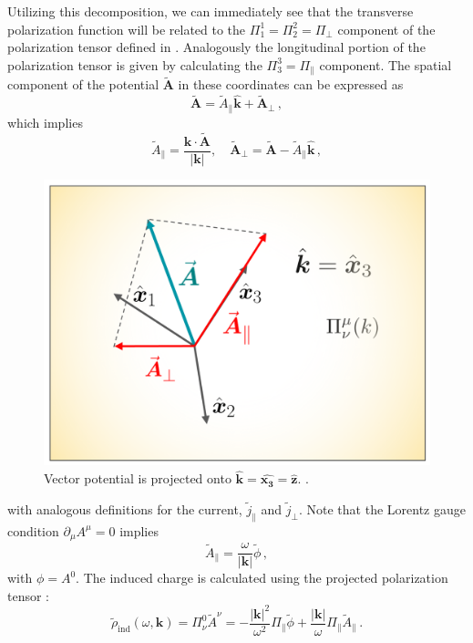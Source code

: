 Utilizing this decomposition, we can immediately see that the transverse polarization function will be related to the $\Pi^1_1 = \Pi^2_2 = \Pi_\perp$ component of the polarization tensor defined in . Analogously the longitudinal portion of the polarization tensor is given by calculating the $\Pi^3_3 = \Pi_\parallel$ component. The spatial component of the potential $\widetilde{\boldsymbol{A}}$  in these coordinates can be expressed as
\begin{equation}
\widetilde{\boldsymbol{A}} = \widetilde{A}_\parallel \hat{\boldsymbol{k}} + \widetilde{\boldsymbol{A}}_\perp\,,
\end{equation}
which implies
\begin{equation}
 \widetilde{A}_{\parallel} = \frac{\boldsymbol{k} \cdot  \widetilde{\boldsymbol{A}}}{|\boldsymbol{k}|}, \quad   \widetilde{\boldsymbol{A}}_{\perp} = \widetilde{\boldsymbol{A}} -  \widetilde{A}_{\parallel}\hat{\boldsymbol{k}}\,,
\end{equation}
\begin{figure}[ht]
    \centering
    \includegraphics[width=0.55\linewidth]{plots/chap01intro/Screenshot 2024-03-14 124133.png}
    \caption{Vector potential is projected onto $\boldsymbol{\hat{k}} = \boldsymbol{\hat{x_3}} =\boldsymbol{\hat{z}}$. .}
    \label{fig:project}
\end{figure}
with analogous definitions for the current, $\widetilde{j}_{\parallel}$ and $\widetilde{j}_{\perp}$. Note that the Lorentz gauge condition $\partial_\mu A^\mu = 0$ implies
\begin{equation}\label{eq:apar}
\widetilde{A}_\parallel = \frac{\omega}{ |\boldsymbol{k}|}\widetilde{\phi}\, ,
\end{equation} 
with $\phi=A^0$. The induced charge is calculated using the projected polarization tensor :
\begin{equation}
    \widetilde{\rho}_\text{ind}(\omega,\boldsymbol{k})  = \Pi^0_\nu \widetilde{A}^\nu = -\frac{|\boldsymbol{k}|^2}{\omega^2} \Pi_{\parallel}\widetilde{\phi} +  \frac{|\boldsymbol{k}|}{\omega}\Pi_{\parallel} \widetilde{A}_{\parallel}\,.
\end{equation}
